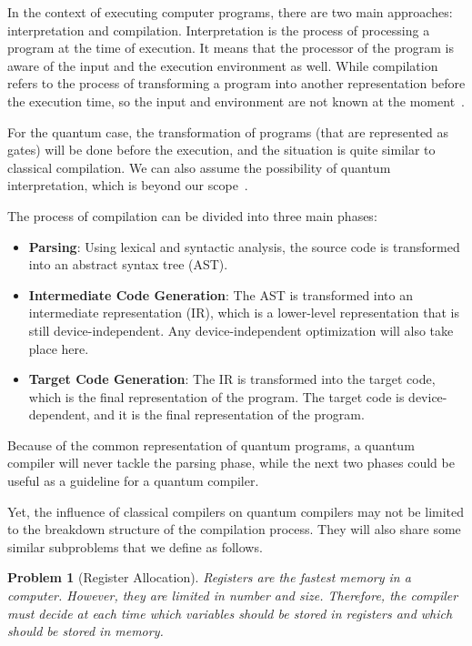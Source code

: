 \documentclass{report}
\newtheorem{problem}{Problem}
\begin{document}
In the context of executing computer programs, there are two main approaches: interpretation and compilation. Interpretation is the process of processing a program at the time of execution. It means that the processor of the program is aware of the input and the execution environment as well. While compilation refers to the process of transforming a program into another representation before the execution time, so the input and environment are not known at the moment~\cite[p. 2]{aho1986}.

For the quantum case, the transformation of programs (that are represented as gates) will be done before the execution, and the situation is quite similar to classical compilation. We can also assume the possibility of quantum interpretation, which is beyond our scope~\cite{gay2009}.

The process of compilation can be divided into three main phases:

\begin{itemize}
  \item \textbf{Parsing}: Using lexical and syntactic analysis, the source code is transformed into an abstract syntax tree (AST).

  \item \textbf{Intermediate Code Generation}: The AST is transformed into an intermediate representation (IR), which is a lower-level representation that is still device-independent. Any device-independent optimization will also take place here.

  \item \textbf{Target Code Generation}: The IR is transformed into the target code, which is the final representation of the program. The target code is device-dependent, and it is the final representation of the program.
\end{itemize}

Because of the common representation of quantum programs, a quantum compiler will never tackle the parsing phase, while the next two phases could be useful as a guideline for a quantum compiler.

Yet, the influence of classical compilers on quantum compilers may not be limited to the breakdown structure of the compilation process. They will also share some similar subproblems that we define as follows.

\begin{problem}[Register Allocation]
  \label{prob:register_allocation}
  Registers are the fastest memory in a computer. However, they are limited in number and size. Therefore, the compiler must decide at each time which variables should be stored in registers and which should be stored in memory.~\cite[pp. 440-444]{allen2001}
\end{problem}
\end{document}
